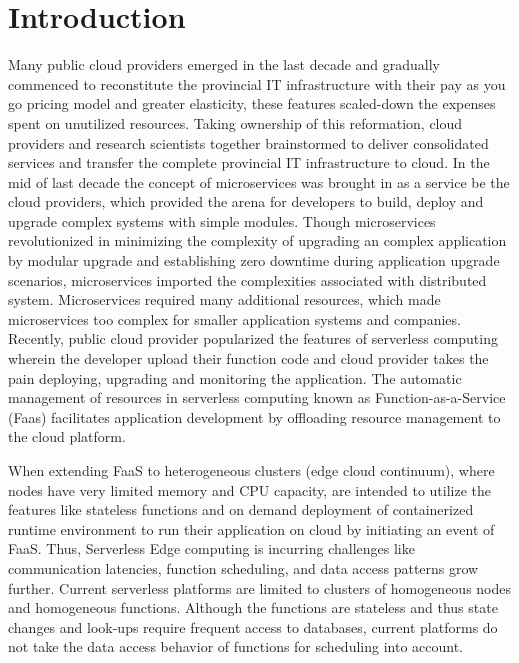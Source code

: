 
\chapter{Introduction}\label{chapter:Introduction}


Many public cloud providers emerged in the last decade and gradually commenced to reconstitute the provincial IT infrastructure with their pay as you go pricing model and greater elasticity, these features scaled-down the expenses spent on unutilized resources.
Taking ownership of this reformation, cloud providers and research scientists together brainstormed to deliver consolidated services and transfer the complete provincial IT infrastructure to cloud. \cite{article}
In the mid of last decade the concept of microservices was brought in as a service be the cloud providers, which provided the arena for developers to build, deploy and upgrade complex systems with simple modules.
Though microservices revolutionized in minimizing the complexity of upgrading an complex application by modular upgrade and establishing zero downtime during application upgrade scenarios, microservices imported the complexities associated with distributed system. 
Microservices required many additional resources, which made microservices too complex for smaller application systems and companies.\cite{singleton2016economics}
Recently, public cloud provider popularized the features of serverless computing wherein the developer upload their function code and cloud provider takes the pain deploying, upgrading and monitoring the application.
The automatic management of resources in serverless computing known as Function-as-a-Service (Faas) facilitates application development by offloading resource management to the cloud platform. 

When extending FaaS to heterogeneous clusters (edge cloud continuum), where nodes have very limited memory and CPU capacity, are intended to utilize the features like stateless functions and on demand deployment of containerized runtime environment to run their application on cloud by initiating an event of FaaS. \cite{8821843} 
Thus, Serverless Edge computing is incurring challenges like communication latencies, function scheduling, and data access patterns grow further.
Current serverless platforms are limited to clusters of homogeneous nodes and homogeneous functions. 
Although the functions are stateless and thus state changes and look-ups require frequent access to databases, current platforms do not take the data access behavior of functions for scheduling into account. \cite{hellerstein2018serverless}

